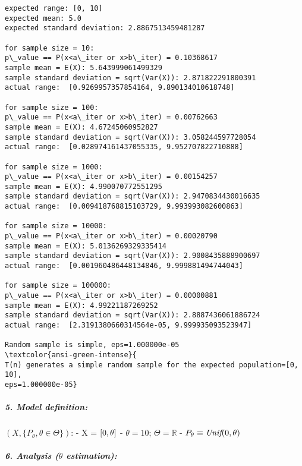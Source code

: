 \documentclass[11pt]{article}
\begin{document}
    \begin{Verbatim}[commandchars=\\\{\}]
expected range: [0, 10]
expected mean: 5.0
expected standard deviation: 2.8867513459481287

for sample size = 10:
p\_value == P(x<a\_iter or x>b\_iter) = 0.10368617
sample mean = E(X): 5.643999061499329
sample standard deviation = sqrt(Var(X)): 2.871822291800391
actual range:  [0.9269957357854164, 9.890134010618748]

for sample size = 100:
p\_value == P(x<a\_iter or x>b\_iter) = 0.00762663
sample mean = E(X): 4.67245060952827
sample standard deviation = sqrt(Var(X)): 3.058244597728054
actual range:  [0.028974161437055335, 9.952707822710888]

for sample size = 1000:
p\_value == P(x<a\_iter or x>b\_iter) = 0.00154257
sample mean = E(X): 4.990070772551295
sample standard deviation = sqrt(Var(X)): 2.9470834430016635
actual range:  [0.009418768815103729, 9.993993082600863]

for sample size = 10000:
p\_value == P(x<a\_iter or x>b\_iter) = 0.00020790
sample mean = E(X): 5.0136269329335414
sample standard deviation = sqrt(Var(X)): 2.9008435888900697
actual range:  [0.001960486448134846, 9.999881494744043]

for sample size = 100000:
p\_value == P(x<a\_iter or x>b\_iter) = 0.00000881
sample mean = E(X): 4.99221187269252
sample standard deviation = sqrt(Var(X)): 2.8887436061886724
actual range:  [2.3191380660314564e-05, 9.999935093523947]

Random sample is simple, eps=1.000000e-05
\textcolor{ansi-green-intense}{
T(n) generates a simple random sample for the expected population=[0, 10],
eps=1.000000e-05}
    \end{Verbatim}

    \vspace{190px}
    \hypertarget{model-definition}{%
\subparagraph{5. Model definition:}\label{model-definition}}

 \((X,\{P_{\theta}, \theta \in \Theta\})\): \newline
- X = \([ 0,\space \theta]\) \newline
- \(\theta = 10\); \(\Theta = \mathbb{R}\) \newline
- \(P_{\theta} \equiv \textit{Unif}\space(0, \theta)\) \newline


\vspace{40px}
    \hypertarget{analysis}{%
\subparagraph{6. Analysis (\(\theta\) estimation):}\label{analysis}}
\end{document}
